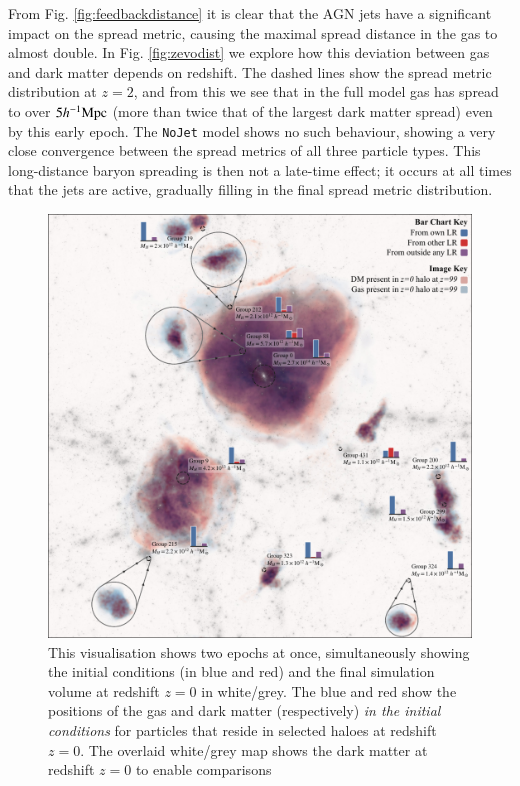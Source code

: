 \documentclass[fleqn,usenatbib]{mnras}
\newcommand{\hmpc}{h^{-1}{\rm Mpc}}
\newcommand{\nojet}{{\tt NoJet}}
\begin{document}
From Fig. \ref{fig:feedbackdistance} it is clear that the AGN jets have a
significant impact on the spread metric, causing the maximal spread distance
in the gas to almost double. In Fig. \ref{fig:zevodist} we explore how this
deviation between gas and dark matter depends on redshift. The dashed lines
show the spread metric distribution at $z=2$, and from this we see that in
the full model gas has spread to over $5\hmpc{}$ (more than twice that of the
largest dark matter spread) even by this early epoch. The \nojet{} model
shows no such behaviour, showing a very close convergence between the spread
metrics of all three particle types. This long-distance baryon spreading is
then not a late-time effect; it occurs at all times that the jets are active,
gradually filling in the final spread metric distribution. \begin{figure}
	\centering
	\vspace{0.5cm}
	\includegraphics{figures/fancy-figure-updated.pdf}
 \caption{ This visualisation shows two epochs at once, simultaneously
 showing the initial conditions (in blue and red) and the final simulation
 volume at redshift $z=0$ in white/grey. The blue and red show the positions
 of the gas and dark matter (respectively) \emph{in the initial conditions}
 for particles that reside in selected haloes at redshift $z=0$. The overlaid
 white/grey map shows the dark matter at redshift $z=0$ to enable comparisons
}
\end{figure}
\end{document}

